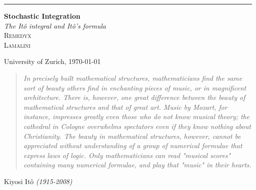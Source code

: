 \documentclass[11pt,a4paper, final]{article}
\begin{document}
\begin{titlepage} %
	
	\raggedleft %
	
	\rule{1pt}{\textheight} %
	\hspace{0.05\textwidth} %
	\parbox[b]{0.75\textwidth}{ %
		
		{\Huge\bfseries Stochastic Integration}\\[2\baselineskip] %
		{\large\textit{The Itô integral and Itô's formula}}\\[4\baselineskip] %
		{\Large\textsc{Remedyx \\
		Lamalini}} %
		
		\vspace{0.5\textheight} %
		
		{\noindent University of Zurich, \today }\\[\baselineskip] %
	}

\end{titlepage}

\newpage
\thispagestyle{empty}
\vspace*{\fill} 
\begin{quote} 
 
\textit{ \Large In precisely built mathematical structures, mathematicians find the same sort of beauty others find in enchanting pieces of music, or in magnificent architecture. There is, however, one great difference between the beauty of mathematical structures and that of great art. Music by Mozart, for instance, impresses greatly even those who do not know musical theory; the cathedral in Cologne overwhelms spectators even if they know nothing about Christianity. The beauty in mathematical structures, however, cannot be appreciated without understanding of a group of numerical formulae that express laws of logic. Only mathematicians can read "musical scores" containing many numerical formulae, and play that "music" in their hearts.}
\end{quote}
\hfill Kiyosi Itô \textit{(1915-2008)}
\vspace*{\fill}
\end{document}
